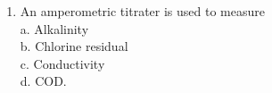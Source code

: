 \begin{tcolorbox}[breakable, enhanced,
colframe=blue!25,
colback=blue!10,
coltitle=blue!20!black,  
title= Chapter Assessment]
\begin{enumerate}
a. i) \& ii) \\
b. i), ii) \& iv) \\
c. i), iv) \& v) \\
d. iii) \& iv) \\
e. iii), iv) \& v) 

\item An amperometric titrater is used to measure \\

a. Alkalinity \\
b. Chlorine residual \\
c. Conductivity \\
d. COD. 


\end{enumerate}
\end{tcolorbox}

